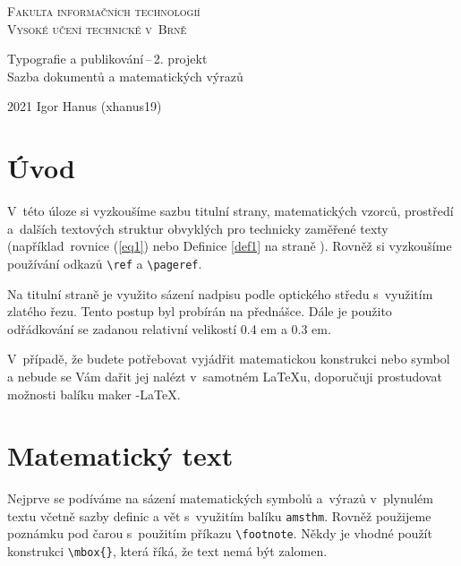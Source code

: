 \documentclass[a4paper, twocolumn, 11pt]{article}
\begin{document}
\begin{titlepage}
    \begin{center}
        {\Huge\textsc
            {Fakulta informačních technologií\\[0.4em]
            Vysoké učení technické v~Brně}
        }
    
    
    {\LARGE 
        Typografie a publikování\,--\,2. projekt\\[0.3em]
        Sazba dokumentů a matematických výrazů
    }
    \end{center}
    
    {\Large 2021 \hfill Igor Hanus (xhanus19)} 
    
\end{titlepage}
\section*{Úvod}
V~této úloze si vyzkoušíme sazbu titulní strany, matematic\-kých vzorců, prostředí 
a~dalších textových struktur obvyklých pro technicky zaměřené texty 
(například~rovnice (\ref{eq1}) nebo Definice \ref{def1} na straně \pageref{def1}). Rovněž si vyzkoušíme používání odkazů \verb|\ref| a \verb|\pageref|.

Na titulní straně je využito sázení nadpisu podle optického středu 
s~využitím zlatého řezu. Tento postup byl probírán na přednášce. 
Dále je použito odřádkování se\: zadanou relativní velikostí 0.4 em a 0.3 em.

V~případě, že budete potřebovat vyjádřit matematickou konstrukci nebo symbol a nebude se Vám dařit jej nalézt v~samotném 
\LaTeX u, doporučuji prostudovat možnosti balíku maker \AmS-\LaTeX.

\section{Matematický text}
Nejprve se podíváme na sázení matematických symbolů a~výrazů v~plynulém textu včetně sazby definic a vět s~využitím balíku 
\texttt{amsthm}. Rovněž použijeme poznámku pod čarou s~použitím příkazu \verb|\footnote|. 
Někdy je vhodné použít konstrukci \verb|\mbox{}|, která říká, že text nemá být zalomen.
\end{document}
